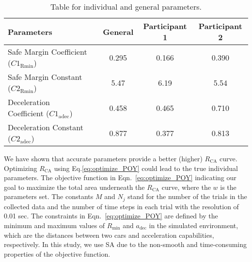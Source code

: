 \begin{table}[htbp]
\caption{Table for individual and general parameters.}
\begin{center}
\label{table:character_average}
\begin{tabular}{l l c c c}
\hline
\textbf{Parameters} &  &\textbf{General} &\textbf{Participant 1} &\textbf{Participant 2} \\
\hline
Safe Margin Coefficient (${C1}_{\mathrm{Rmin}}$)     & & 0.295 & 0.166 & 0.390 \\
Safe Margin Constant (${C2}_{\mathrm{Rmin}}$)        & & 5.47 & 6.19 & 5.54  \\
Deceleration Coefficient (${C1}_{\mathrm{adec}}$)    & & 0.458 & 0.465 & 0.710 \\
Deceleration Constant (${C2}_{\mathrm{adec}}$)       & & 0.877 & 0.377 & 0.813 \\
\hline
\end{tabular}
\end{center}
\end{table}



We have shown that accurate parameters provide a better (higher) $R_{\mathrm{CA}}$ curve. Optimizing $R_{\mathrm{CA}}$ using Eq.\ref{eq:optimize_POY} could lead to the true individual parameters. The objective function in Eqn.~\ref{eq:optimize_POY} indicating our goal to maximize the total area underneath the $R_{\mathrm{CA}}$ curve, where the $w$ is the parameters set. The constants $M$ and $N_j$ stand for the number of the trials in the collected data and the number of time steps in each trial with the resolution of 0.01 sec. The constraints in Eqn.~\ref{eq:optimize_POY} are defined by the minimum and maximum values of $R_{\mathrm{min}}$ and $a_{\mathrm{dec}}$ in the simulated environment, which are the distances between two cars and acceleration capabilities, respectively. In this study, we use \ac*{SA}  due to the non-smooth and time-consuming properties of the objective function. 




